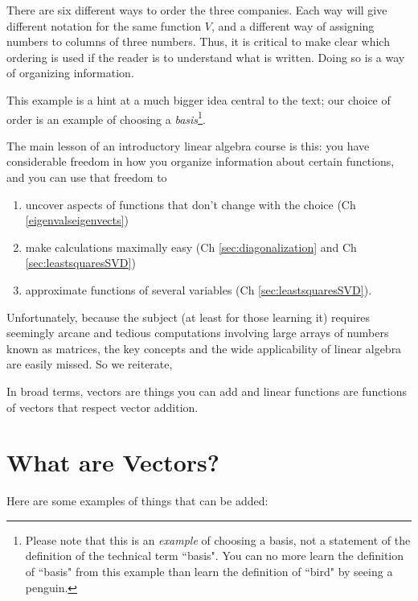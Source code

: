 \begin{example}
There are six different ways to order the three companies. 
Each way will give different notation for the same function $V$, and a different way of assigning numbers to columns of three numbers. 
Thus, it is critical to make clear which ordering is used if the reader is to understand what is written. 
Doing so is a way of organizing information. 

This example is a hint at a much bigger idea central to the text; 
our choice of order is an example of choosing a {\itshape basis}\footnote{
Please note that this is an {\itshape example} of choosing a basis, 
not a statement of the definition of the technical term ``basis". 
You can no more learn the definition of ``basis"  from this example 
than learn the definition of  ``bird" by seeing a penguin.}\!\!. 
\end{example}

The main lesson of an introductory linear algebra course is this: 
you have considerable freedom in how you organize information about certain functions, 
and you can use that  freedom to 
\begin{enumerate}
\item uncover aspects of functions that don't change with the choice (Ch \ref{eigenvalseigenvects})
\item make calculations maximally easy (Ch \ref{sec:diagonalization}  and Ch \ref{sec:leastsquaresSVD}) 
\item approximate functions of several variables (Ch \ref{sec:leastsquaresSVD}).
\end{enumerate}
Unfortunately, because the subject (at least for those learning it) requires seemingly arcane and tedious computations
involving large arrays of numbers known as matrices, the key concepts and the wide applicability of linear algebra are
easily missed. So we reiterate, 

\vspace{3mm}
\vspace{3mm}

\noindent In broad terms, vectors are things you can add and  linear functions are 
functions of vectors that respect vector addition. 



\noindent 
\section{What are Vectors?}
Here are some examples of things that can be added:


